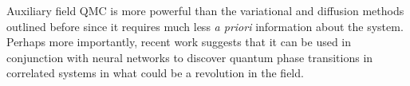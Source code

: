 Auxiliary field \ac{QMC} is more powerful than the variational and diffusion methods outlined before since it requires much less \emph{a priori} information about the system.
Perhaps more importantly, recent work suggests that it can be used in conjunction with neural networks to discover quantum phase transitions in correlated systems  \cite{broecker_machine_2017} in what could be a revolution in the field.